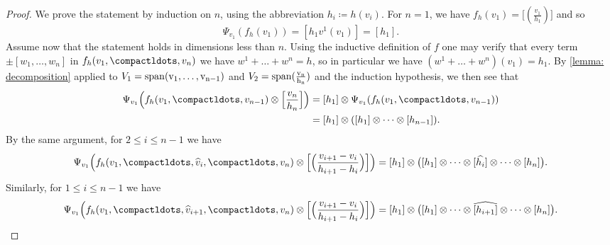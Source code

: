 \documentclass[a4paper]{amsart}
\begin{document}
\begin{proof}
We prove the statement by induction on $n$, using the abbreviation $h_i \coloneq h(v_i)$. For $n=1$, we have 
$f_h(v_1)=\big[(\tfrac{v_1}{h_1})\big]$ and so 
\[
\Psi_{v_1}(f_h(v_1))=[h_1v^1(v_1)]=[h_1].
\]
Assume now that the statement holds in dimensions less than $n$. Using the inductive definition of $f$ one may verify that every term $\pm[w_1,\dots,w_n]$ in $f_h(v_1,\compactldots,v_n)$ we have $w^1+\dots+w^n=h$, so in particular we have $(w^1+\dots+w^n)(v_1)=h_1$. By \cref{lemma: decomposition} applied to $V_1=\rm{span}(v_1,\dots, v_{n-1})$ and  $V_2=\rm{span}(\tfrac{v_n}{h_n})$ and the induction hypothesis, we then see that
\begin{align*}
\Psi_{v_1}\Bigl(f_h(v_1,\compactldots,v_{n-1})\otimes \Bigl[\frac{v_n}{h_n}\Bigr] \Bigr)&=[h_1]\otimes \Psi_{v_1}(f_h(v_1,\compactldots,v_{n-1})) \\
&=[h_1]\otimes ([h_1] \otimes \dots \otimes [h_{n-1}]).\end{align*}
By the same  argument, for $2\leq i \leq n-1$ we have 
\[
\Psi_{v_1}\Bigl(f_h(v_1,\compactldots,\widehat{v}_{i},\compactldots,v_n)\otimes \Bigl[\Bigl(\frac{v_{i+1}-v_i}{h_{i+1}-h_i}\Bigr)\Bigr]\Bigr)=[h_1] \otimes \bigl([h_1]\otimes \dots \otimes [\widehat{h_{i}}] \otimes \dots \otimes [h_n]\bigr).
\]
Similarly, for $1\leq i \leq n-1$ we have
\[\Psi_{v_1}\Bigl(f_h(v_1,\compactldots,\widehat{v}_{i+1},\compactldots,v_n)\otimes \Bigl[\Bigl(\frac{v_{i+1}-v_i}{h_{i+1}-h_i}\Bigr)\Bigr]\Bigr)=[h_1] \otimes \bigl([h_1]\otimes \dots \otimes \widehat{[h_{i+1}]} \otimes \dots \otimes [h_n]\bigr).
\]


\end{proof}
\end{document}
